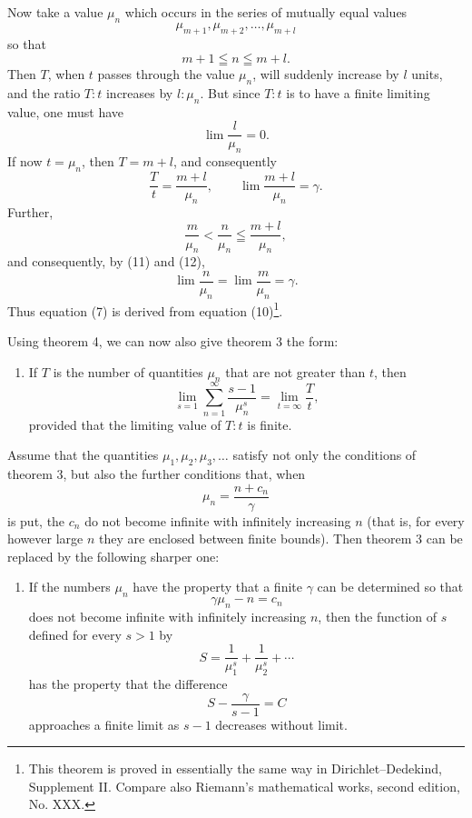 \documentclass[11pt]{article}
\begin{document}
Now take a value $\mu_n$ which occurs in the series of mutually equal values
\[
\mu_{m+1},\mu_{m+2},\ldots,\mu_{m+l}
\]
so that
\[
m+1\leqq n\leqq m+l.
\]
Then $T$, when $t$ passes through the value $\mu_n$, will suddenly increase by $l$ units, and the ratio $T:t$ increases by $l:\mu_n$. But since $T:t$ is to have a finite limiting value, one must have
\begin{equation}
\lim\frac{l}{\mu_n}=0.
\tag{11}
\end{equation}
If now $t=\mu_n$, then $T=m+l$, and consequently
\begin{equation}
\frac{T}{t}=\frac{m+l}{\mu_n},\qquad
\lim\frac{m+l}{\mu_n}=\gamma.
\tag{12}
\end{equation}
Further,
\[
\frac{m}{\mu_n}<\frac{n}{\mu_n}\leqq\frac{m+l}{\mu_n},
\]
and consequently, by (11) and (12),
\[
\lim\frac{n}{\mu_n}=\lim\frac{m}{\mu_n}=\gamma.
\]
Thus equation (7) is derived from equation (10)\footnote{This theorem is proved in essentially the same way in Dirichlet--Dedekind, Supplement II. Compare also Riemann's mathematical works, second edition, No. XXX.}.

Using theorem 4, we can now also give theorem 3 the form:

\begin{enumerate}[label=\textbf{\arabic*.},leftmargin=2.2em,start=5]
\item If $T$ is the number of quantities $\mu_n$ that are not greater than $t$, then
\begin{equation}
\lim_{s=1}\sum_{n=1}^{\infty}\frac{s-1}{\mu_n^s}=\lim_{t=\infty}\frac{T}{t},
\tag{13}
\end{equation}
provided that the limiting value of $T:t$ is finite.
\end{enumerate}

Assume that the quantities $\mu_1,\mu_2,\mu_3,\ldots$ satisfy not only the conditions of theorem 3, but also the further conditions that, when
\begin{equation}
\mu_n=\frac{n+c_n}{\gamma}
\tag{14}
\end{equation}
is put, the $c_n$ do not become infinite with infinitely increasing $n$ (that is, for every however large $n$ they are enclosed between finite bounds). Then theorem 3 can be replaced by the following sharper one:

\begin{enumerate}[label=\textbf{\arabic*.},leftmargin=2.2em,start=6]
\item If the numbers $\mu_n$ have the property that a finite $\gamma$ can be determined so that
\begin{equation}
\gamma\mu_n-n=c_n
\tag{15}
\end{equation}
does not become infinite with infinitely increasing $n$, then the function of $s$ defined for every $s>1$ by
\begin{equation}
S=\frac1{\mu_1^s}+\frac1{\mu_2^s}+\cdots
\tag{16}
\end{equation}
has the property that the difference
\begin{equation}
S-\frac{\gamma}{s-1}=C
\tag{17}
\end{equation}
approaches a finite limit as $s-1$ decreases without limit.
\end{enumerate}
\end{document}
